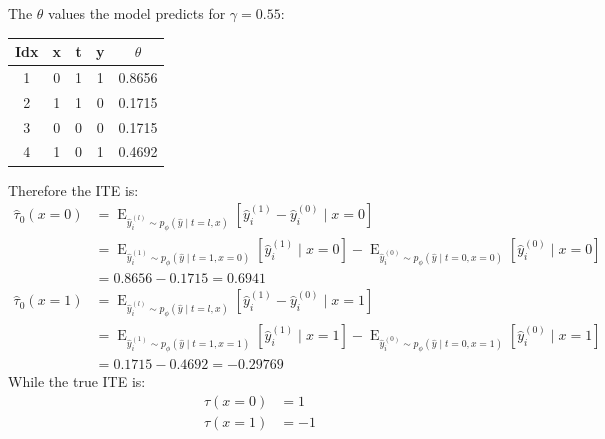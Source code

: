 \documentclass[oneside,12pt]{article}
\begin{document}
%
The $\theta$ values the model predicts for $\gamma=0.55$:
%
\begin{center}
 \begin{tabular}{||c | c | c | c | c ||}
 \hline
 Idx & x & t & y & $\theta$ \\ [0.5ex] 
 \hline\hline
 1 & 0 & 1 & 1 & 0.8656 \\ 
 \hline
 2 & 1 & 1 & 0 & 0.1715 \\
 \hline
 3 & 0 & 0 & 0 & 0.1715 \\
 \hline
 4 & 1 & 0 & 1 & 0.4692 \\ [1ex] 
 \hline
\end{tabular}
\end{center}
%
Therefore the ITE is:
%
\begin{equation}
    \begin{split}
        \hat{\tau}_0(x=0) &= \operatorname{E}_{\hat{y}_i^{(l)} \sim p_\phi(\hat{y} \mid t=l,x)}\left[\hat{y}_i^{(1)}-\hat{y}_i^{(0)} \mid x=0 \right]\\
        &= \operatorname{E}_{\hat{y}_i^{(1)} \sim p_\phi(\hat{y} \mid t=1,x=0)}\left[\hat{y}_i^{(1)} \mid x=0 \right] - \operatorname{E}_{\hat{y}_i^{(0)} \sim p_\phi(\hat{y} \mid t=0,x=0)}\left[\hat{y}_i^{(0)} \mid x=0 \right]\\
        &= 0.8656 - 0.1715 = 0.6941\\
        \hat{\tau}_0(x=1) &= \operatorname{E}_{\hat{y}_i^{(l)} \sim p_\phi(\hat{y} \mid t=l,x)}\left[\hat{y}_i^{(1)}-\hat{y}_i^{(0)} \mid x=1 \right]\\
        &= \operatorname{E}_{\hat{y}_i^{(1)} \sim p_\phi(\hat{y} \mid t=1,x=1)}\left[\hat{y}_i^{(1)} \mid x=1 \right] - \operatorname{E}_{\hat{y}_i^{(0)} \sim p_\phi(\hat{y} \mid t=0,x=1)}\left[\hat{y}_i^{(0)} \mid x=1 \right]\\
        &= 0.1715 - 0.4692 = -0.29769    
    \end{split}
\end{equation}
%
While the true ITE is:
\begin{equation}
    \begin{split}
        \tau(x=0) &= 1\\
        \tau(x=1) &= -1
    \end{split}
\end{equation}
\end{document}
